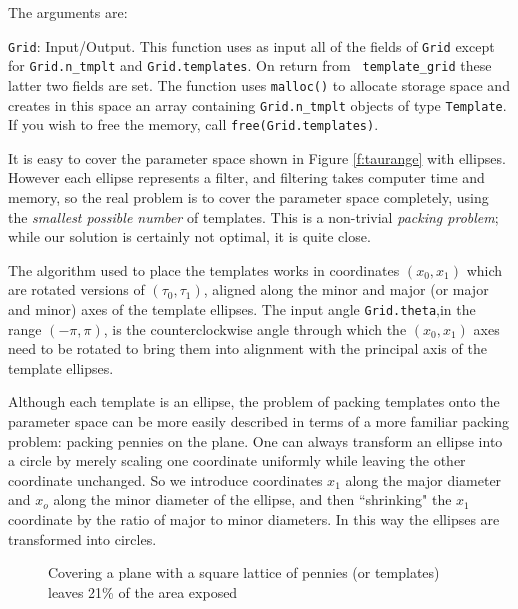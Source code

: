 The arguments are:
\begin{description}
\item{\tt Grid}: Input/Output.
This function uses as input all of the fields of {\tt Grid} except for
{\tt Grid.n\_tmplt} and {\tt Grid.templates}.  On return from {\tt
template\_grid} these latter two fields are set.  The function uses
{\tt malloc()} to allocate storage space and creates in this space an
array containing {\tt Grid.n\_tmplt} objects of type {\tt Template}.
If you wish to free the memory, call {\tt free(Grid.templates)}.
\end{description}


It is easy to cover the parameter space shown in Figure
\ref{f:taurange} with ellipses.  However each ellipse represents a
filter, and filtering takes computer time and memory, so the real
problem is to cover the parameter space completely, using the {\it
smallest possible number} of templates.  This is a non-trivial {\it packing
problem}; while our solution is certainly not optimal, it is quite
close.

The algorithm used to place the templates works in coordinates
$(x_0,x_1)$ which are rotated versions of $(\tau_0,\tau_1)$, aligned
along the minor and major (or major and minor) axes of the template
ellipses.  The input angle {\tt Grid.theta},in the range $(-\pi,\pi)$,
is the counterclockwise angle through which the $(x_0,x_1)$ axes need
to be rotated to bring them into alignment with the principal axis of
the template ellipses.

Although each template is an ellipse, the problem of packing templates
onto the parameter space can be more easily described in terms of a more
familiar packing problem: packing pennies on the plane.  One can always
transform an ellipse into a circle by merely scaling one coordinate
uniformly while leaving the other coordinate unchanged.  So we
introduce coordinates $x_1$ along the major diameter and $x_o$ along
the minor diameter of the ellipse, and then ``shrinking" the $x_1$
coordinate by the ratio of major to minor diameters.  In this
way the ellipses are transformed into circles.

\begin{figure}[h]
\begin{center}
\caption{\label{f:pennies} Covering a plane with a square lattice of
pennies (or templates) leaves 21\% of the area exposed}
\end{center}
\end{figure}

